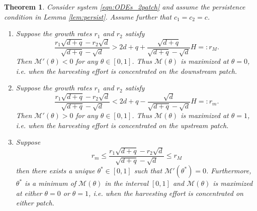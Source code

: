 \documentclass[11pt]{article}
\newtheorem{theorem}{Theorem}[section]
\def\MM{\mathcal{M}}
\theoremstyle{definition}
\begin{document}
 

\begin{theorem}\label{theorem:M'}
 Consider system \eqref{eqn:ODEs_2patch} and assume the persistence condition in Lemma \ref{lem:persist}. Assume further that $c_1=c_2=c$.
    \begin{enumerate}
        \item[(a)] Suppose the growth rates $r_1$ and $r_2$ satisfy 
        \[\frac{r_1\sqrt{d+q}-r_2\sqrt{d}}{\sqrt{d+q}-\sqrt{d}}> 2d+q +\frac{\sqrt{d+q}}{\sqrt{d+q}-\sqrt{d}}H=:r_M.\]
        Then $\MM'(\theta)< 0$ for any $\theta\in[0,1]$. Thus $\MM(\theta)$ is maximized at $\theta=0$, i.e. when the harvesting effort is concentrated on the downstream patch.
        \item[(b)]  Suppose the growth rates $r_1$ and $r_2$ satisfy 
        \[\frac{r_1\sqrt{d+q}-r_2\sqrt{d}}{\sqrt{d+q}-\sqrt{d}}< 2d+q -\frac{\sqrt{d}}{\sqrt{d+q}-\sqrt{d}}H=:r_m.\]
        Then $\MM'(\theta)> 0$ for any $\theta\in[0,1]$. Thus $\MM(\theta)$ is maximized at $\theta=1$, i.e. when the harvesting effort is concentrated on the upstream patch.
        \item[(c)] Suppose 
        \[
        r_m\leq \frac{r_1\sqrt{d+q}-r_2\sqrt{d}}{\sqrt{d+q}-\sqrt{d}}\leq r_M
        \]
        then there exists a unique $\theta^*\in[0,1]$ such that $\MM'(\theta^*)=0$. Furthermore, $\theta^*$ is a minimum of $\MM(\theta)$ in the interval $[0,1]$ and $\MM(\theta)$ is maximized at either $\theta=0$ or $\theta=1$, i.e. when the harvesting effort is concentrated  on either patch.
        \end{enumerate}
\end{theorem}
\end{document}
